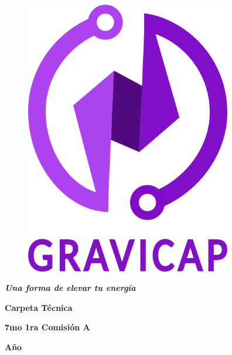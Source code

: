 \documentclass[28pt, a4paper]{report}
\begin{document}
\begin{titlepage}

        \begin{center}      
            \begin{figure} [!ht]
                \centering
                \includegraphics [width=9cm]{Imagenes/Preface/Logo-Nombre.png}
                \label{Logo-Nombre}
            \end{figure}
            
                \vspace{0.5cm}
                {\LARGE\textbf{{\textcolor{dark_violet}{\textbf{\textit{Una forma de elevar tu energía}}}}}}\par
                \vspace{0.5cm}
                
            {\Huge\textbf{Carpeta Técnica}}\par
                \vspace{1cm}
                
            {\LARGE\textbf{7mo 1ra Comisión A}}\par
                \vspace{0.2cm}
                
            {\LARGE\textbf{Año \the\year}}\par
                \vspace{1cm}
                

\end{center}
\end{titlepage}
\end{document}
